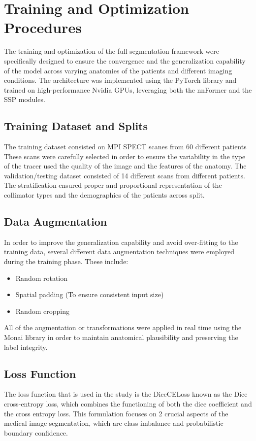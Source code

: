 \section{Training and Optimization Procedures}
The training and optimization of the full segmentation framework were specifically designed to ensure the convergence and the generalization capability of the model across varying anatomies of the patients and different imaging conditions. The architecture was implemented using the PyTorch library and trained on high-performance Nvidia GPUs, leveraging both the nnFormer and the SSP modules.

\subsection{Training Dataset and Splits}
The training dataset consisted on MPI SPECT scanes from 60 different patients These scans were carefully selected in order to ensure the variability in the type of the tracer used the quality of the image and the features of the anatomy. The validation/testing dataset consisted of 14 different scans from different patients. The stratification ensured proper and proportional representation of the collimator types and the demographics of the patients across split.

\subsection{Data Augmentation}
In order to improve the generalization capability and avoid over-fitting to the training data, several different data augmentation techniques were employed during the training phase. These include: 
\begin{itemize}
\item Random rotation \item Spatial padding (To ensure consistent input size) \item Random cropping 
\end{itemize}

All of the augmentation or transformations were applied in real time using the Monai library in order to maintain anatomical plausibility and preserving the label integrity.

\subsection{Loss Function}
The loss function that is used in the study is the DiceCELoss known as the Dice cross-entropy loss, which combines the functioning of both the dice coefficient and the cross entropy loss. This formulation focuses on 2 crucial aspects of the medical image segmentation, which are class imbalance and probabilistic boundary confidence.

